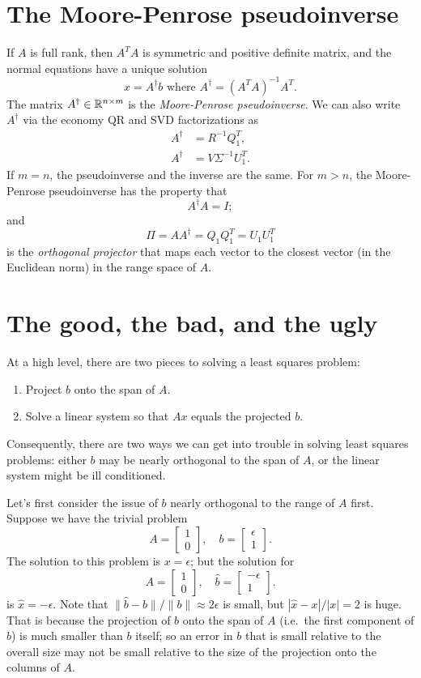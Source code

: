 \documentclass[12pt, leqno]{article}
\begin{document}
\section{The Moore-Penrose pseudoinverse}

If $A$ is full rank, then $A^T A$ is symmetric and positive definite
matrix, and the normal equations have a unique solution
\[
  x = A^{\dagger} b \mbox{ where } A^{\dagger} = (A^T A)^{-1} A^T.
\]
The matrix $A^\dagger \in \mathbb{R}^{n \times m}$ is the
{\em Moore-Penrose pseudoinverse}.  We can also write $A^\dagger$
via the economy QR and SVD factorizations as
\begin{align*}
  A^\dagger &= R^{-1} Q_1^T, \\
  A^\dagger &= V \Sigma^{-1} U_1^T.
\end{align*}
If $m = n$, the pseudoinverse and the inverse are
the same.  For $m > n$, the Moore-Penrose pseudoinverse
has the property that
\[
  A^\dagger A = I;
\]
and
\[
  \Pi = A A^\dagger = Q_1 Q_1^T = U_1 U_1^T
\]
is the {\em orthogonal projector} that maps each vector to the
closest vector (in the Euclidean norm) in the range space of $A$.

\section{The good, the bad, and the ugly}

At a high level, there are two pieces to solving a least squares
problem:
\begin{enumerate}
\item Project $b$ onto the span of $A$.
\item Solve a linear system so that $Ax$ equals the projected $b$.
\end{enumerate}
Consequently, there are two ways we can get into trouble in solving
least squares problems: either $b$ may be nearly orthogonal to the
span of $A$, or the linear system might be ill conditioned.

Let's first consider the issue of $b$ nearly orthogonal to the
range of $A$ first.  Suppose we have the trivial problem
\[
A = \begin{bmatrix} 1 \\ 0 \end{bmatrix}, \quad
b = \begin{bmatrix} \epsilon \\ 1 \end{bmatrix}.
\]
The solution to this problem is $x = \epsilon$; but the solution for
\[
A = \begin{bmatrix} 1 \\ 0 \end{bmatrix}, \quad
\hat b = \begin{bmatrix} -\epsilon \\ 1 \end{bmatrix}.
\]
is $\hat x = -\epsilon$.  Note that $\|\hat b-b\|/\|b\| \approx 2
\epsilon$ is small, but $|\hat x - x|/|x| = 2$ is huge.  That is
because the projection of $b$ onto the span of $A$ (i.e.~the first
component of $b$) is much smaller than $b$ itself; so an error in $b$
that is small relative to the overall size may not be small relative
to the size of the projection onto the columns of $A$.
\end{document}
